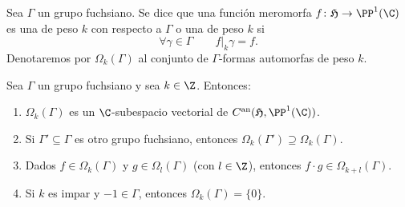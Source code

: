 \documentclass[teoria-numeros.tex]{subfiles}
\begin{document}
\begin{mydefi}
	Sea $\Gamma$ un grupo fuchsiano.
	Se dice que una función meromorfa $f \colon \mathfrak{H} \to \PP^1(\C)$ es una  de peso $k$
	con respecto a $\Gamma$ o una  de peso $k$ si
	$$ \forall \gamma \in \Gamma \qquad f|_k \gamma = f. $$
	Denotaremos por $\Omega_k(\Gamma)$ al conjunto de $\Gamma$-formas automorfas de peso $k$.
\end{mydefi}
\begin{cor}
	Sea $\Gamma$ un grupo fuchsiano y sea $k \in \Z$. Entonces:
	\begin{enumerate}
		\item $\Omega_k(\Gamma)$ es un $\C$-subespacio vectorial de $C^{\rm an}(\mathfrak{H}, \PP^1(\C))$.
		\item Si $\Gamma' \subseteq \Gamma$ es otro grupo fuchsiano, entonces $\Omega_k(\Gamma') \supseteq \Omega_k(\Gamma)$.
		\item Dados $f \in \Omega_k(\Gamma)$ y $g \in \Omega_l(\Gamma)$ (con $l \in \Z$),
			entonces $f\cdot g \in \Omega_{k+l}(\Gamma)$.
		\item Si $k$ es impar y $-1 \in \Gamma$, entonces $\Omega_k(\Gamma) = \{ 0 \}$.
	\end{enumerate}
\end{cor}

\printbibliography[segment=\therefsegment, check=onlynew, notcategory=historical]
\end{document}
